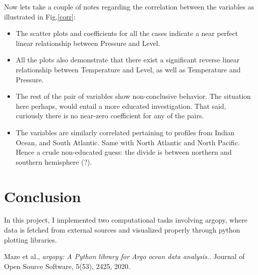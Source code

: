 \documentclass[12pt]{article}
\begin{document}
Now lets take a couple of notes regarding the
correlation between the variables as illustrated in
Fig.\ref{corr}:
    
\begin{itemize}
    \item The scatter plots and coefficients for all the cases 
    indicate a near perfect
    linear relationship between Pressure and Level. 
    \item All the plots also demonstrate that there exist a 
    significant reverse linear relationship between Temperature 
    and Level,
    as well as Temperature and Pressure.
    \item The rest of the pair of variables show non-conclusive 
    behavior. The situation here perhaps, would entail a more educated 
    investigation. That said, curiously there is no near-zero 
    coefficient for any of the pairs.
    \item The variables are similarly correlated pertaining to 
    profiles from Indian Ocean, and South Atlantic. Same with North Atlantic
    and North Pacific. Hence a crude non-educated guess: the divide 
    is between northern and southern hemisphere (?).
\end{itemize}

\section{Conclusion}
In this project, I implemented two computational tasks involving argopy, where
data is fetched from external sources and visualized properly through python plotting
libraries.

\begin{thebibliography}{9}
    Maze et al.,
    \textit{argopy: A Python library for Argo ocean data analysis.}. 
    Journal of Open Source Software, 5(53), 2425, 2020.
\end{thebibliography}
\end{document}
